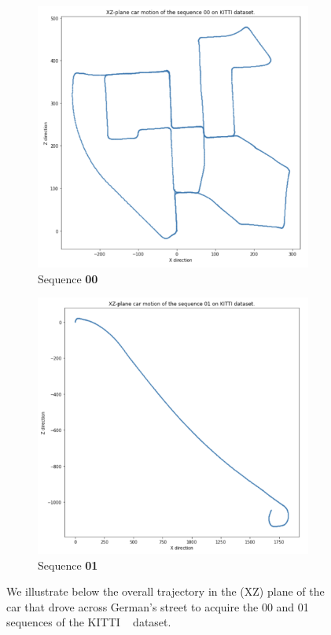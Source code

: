 \begin{figure}[htpb!]
    \centering
    \begin{subfigure}[b]{0.48\linewidth}
      \includegraphics[width=\linewidth]{images/epipolarnvs/XYplaneMotionKITTI.png}
      \caption{Sequence \textbf{00}}
    \end{subfigure}
    \quad %
    \begin{subfigure}[b]{0.48\linewidth}
      \includegraphics[width=\linewidth]{images/epipolarnvs/XYplaneMotionKITTI01.png}
      \caption{Sequence \textbf{01}}
    \end{subfigure}
    \caption{We illustrate below the overall trajectory in the (XZ) plane of the car that drove across German's street to acquire the 00 and 01 sequences of the KITTI ~\citep{geiger2012we} dataset.}
    \label{fig:test}
  \end{figure}

